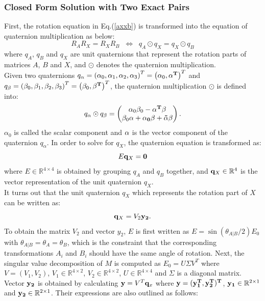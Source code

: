 \documentclass[twocolumn,10pt]{asme2ej}
\newcommand{\qq}{{\bf q}}
\begin{document}
\subsubsection{Closed Form Solution with Two Exact Pairs}
First, the rotation equation in Eq.(\ref{axxb}) is transformed into the equation of quaternion multiplication as below:
\begin{equation}
R_{A}R_{X} = R_{X}R_{B} 
\; \;
\Leftrightarrow
\; \;
q_{A}\odot q_{X} = q_{X}\odot q_{B}
\label{Quaternion}
\end{equation} 
where $q_{A}$, $q_{B}$ and $q_{X}$ are
unit quaternions that represent the rotation parts of matrices $A$, $B$ and $X$, and $\odot$ denotes the  quaternion multiplication.\\
Given two quaternions $q_{\alpha} = \left( \alpha_{0}, \alpha_{1}, \alpha_{2},\alpha_{3} \right)^{T} = \left( \alpha_{0}, \bf{\alpha}^{T} \right)^{T}$ and $q_{\beta} = \left( \beta_{0}, \beta_{1}, \beta_{2},\beta_{3} \right)^{T} = \left(\beta_{0}, \bf{\beta}^{T} \right)^{T}$, the quaternion multiplication $\odot$ is defined into:
\begin{equation}
q_{\alpha}\odot q_{\beta} = 
\left(
\begin{matrix}
\alpha_{0} \beta_{0} - \bf{\alpha}^{T}\bf{\beta}\\
\beta_{0}\bf{\alpha} + \alpha_{0}\bf{\beta} + \bf{\tilde{\alpha}\beta}
\end{matrix}
\right).
\end{equation}
$\alpha_{0}$ is called the scalar component and $\bf{\alpha}$ is the vector component of the quaternion $q_{\alpha}$.
In order to solve for $q_{X}$, the quaternion equation is transformed as:
\begin{equation}
E\qq_{X} = \bf 0
\end{equation}
where $E \in \mathbb{R}^{4 \times 4}$ is obtained by grouping $q_{A}$ and $q_{B}$ together, and $\qq_{X} \in \mathbb{R}^4$ is the vector representation of the unit quaternion ${q_X}$.\\

It turns out that the unit quaternion $q_X$ which represents the rotation part of $X$ can be written as: 
\begin{equation}
\qq_{X} = V_{2}\bf y_{2}.
\label{QuaternionUnit}
\end{equation}
To obtain the matrix $V_{2}$ and vector $y_{2}$, $E$ is first written as $E =  \sin(\theta_{A|B}/2)E_0$ with $\theta_{A|B} = \theta_{A} = \theta_{B}$, which is the constraint that the corresponding transformations $A_i$ and $B_i$ should have the same angle of rotation. Next, the singular value decomposition of $M$ is computed as $E_0 = U\Sigma V^{T}$ where $V = (V_{1}, V_{2})$,  $V_{1} \in \mathbb{R}^{4 \times 2}$, $V_{2} \in \mathbb{R}^{4 \times 2}$, $U \in \mathbb{R}^{4 \times 4}$ and $\Sigma$ is a diagonal matrix. Vector ${\bf y_{2}}$ is obtained by calculating ${\bf y} =  V^{T}\qq_{x}$ where $\bf y = (\bf y^{T}_{1},\bf y^{T}_{2} )^{T}$, ${\bf y_{1}} \in \mathbb{R}^{2 \times 1}$ and ${\bf y_{2}} \in \mathbb{R}^{2 \times 1}$. Their expressions are also outlined as follows:\\
\end{document}
